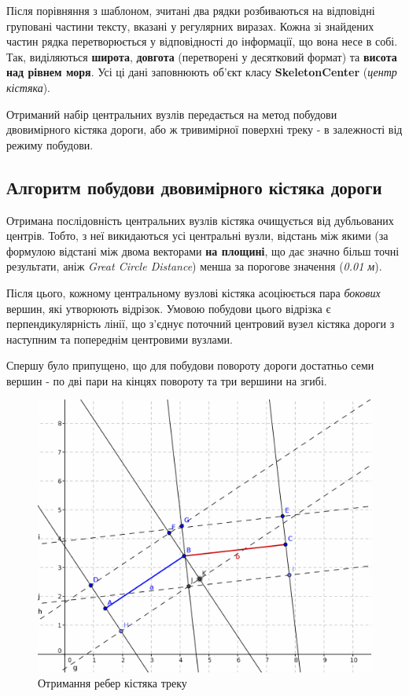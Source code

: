 \documentclass[simple,a4paper,14pt,ukrainian,utf8]{eskdtext}
\begin{document}
	Після порівняння з шаблоном, зчитані два рядки розбиваються на відповідні груповані частини тексту, вказані у регулярних виразах. Кожна зі знайдених частин рядка перетворюється у відповідності до інформації, що вона несе в собі. Так, виділяються \textbf{широта}, \textbf{довгота} (перетворені у десятковий формат) та \textbf{висота над рівнем моря}. Усі ці дані заповнюють об’єкт класу \textbf{SkeletonCenter} (\textit{центр кістяка}).
	
	Отриманий набір центральних вузлів передається на метод побудови двовимірного кістяка дороги, або ж тривимірної поверхні треку - в залежності від режиму побудови.
	
	\subsection{Алгоритм побудови двовимірного кістяка дороги}
	
		Отримана послідовність центральних вузлів кістяка очищується від дубльованих центрів. Тобто, з неї викидаються усі центральні вузли, відстань між якими (за формулою відстані між двома векторами \textbf{на площині}, що дає значно більш точні результати, аніж \textit{Great Circle Distance}) менша за порогове значення (\textit{0.01 м}).
		
		Після цього, кожному центральному вузлові кістяка асоціюється пара \textit{бокових} вершин, які утворюють відрізок. Умовою побудови цього відрізка є перпендикулярність лінії, що з’єднує поточний центровий вузел кістяка дороги з наступним та попереднім центровими вузлами. 
		
		Спершу було припущено, що для побудови повороту дороги достатньо семи вершин - по дві пари на кінцях повороту та три вершини на згибі.
		
		\vspace{2em}
		\begin{figure}
			\centering \includegraphics[scale=0.3]{images/perpendicular_2_1.png}
			\caption{Отримання ребер кістяка треку}
		\end{figure}
		
\end{document}
